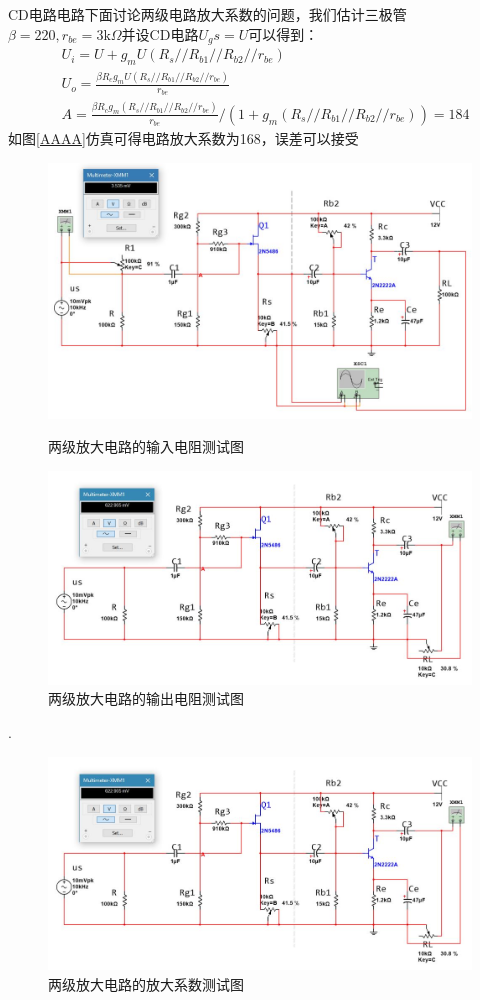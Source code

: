\documentclass[UTF8,a4paper]{ctexart}
\begin{document}
CD电路电路下面讨论两级电路放大系数的问题，我们估计三极管$\beta=220,r_{be}=3\mathrm{k}\Omega$并设CD电路$U_gs=U$可以得到：
\begin{equation}\begin{aligned}
&U_i=U+g_mU(R_s//R_{b1}//R_{b2}//r_{be}) \\ 
&U_o=\frac{\beta R_cg_mU(R_s//R_{b1}//R_{b2}//r_{be})}{r_{be}}\\
&A=\frac{\beta R_cg_m(R_s//R_{b1}//R_{b2}//r_{be})}{r_{be}}/(1+g_m(R_s//R_{b1}//R_{b2}//r_{be}))=184
\end{aligned}\end{equation}
如图\ref{AAAA}仿真可得电路放大系数为168，误差可以接受
\begin{figure}
\centering
\includegraphics[width=\textwidth]{Ri2.jpg}
\caption{两级放大电路的输入电阻测试图}
\label{ri1}
\includegraphics [width=\textwidth]{Ro2.jpg}
\caption{两级放大电路的输出电阻测试图}
\label{ro2}
\end{figure}.
\begin{figure}
\includegraphics [width=\textwidth]{Ro2.jpg}
\caption{两级放大电路的放大系数测试图}
\label{ro2}
\end{figure}
\end{document}
